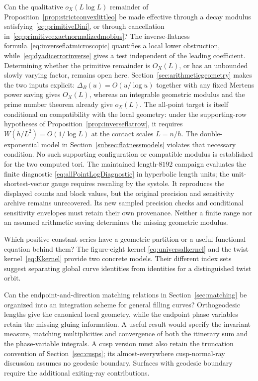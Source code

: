 \begin{question}
Can the qualitative $o_X(L\log L)$ remainder of
Proposition~\ref{prop:strictconvexlittleo} be made effective through a
decay modulus satisfying~\eqref{eq:primitiveDini}, or through cancellation
in~\eqref{eq:primitiveexactnormalizedmobius}? The inverse-flatness
formula~\eqref{eq:inverseflatmicroscopic} quantifies a local lower
obstruction, while~\eqref{eq:dyadicerrorinverse} gives a test independent
of the leading coefficient. Determining whether the primitive remainder
is $O_X(L)$, or has an unbounded slowly varying factor, remains open here.
Section~\ref{sec:arithmeticgeometry} makes the two inputs explicit:
$\Delta_B(u)=O(u/\log u)$ together with any fixed Mertens power
saving gives $O_X(L)$, whereas an integrable geometric modulus and
the prime number theorem already give $o_X(L)$.
The all-point target is itself conditional on compatibility with the
local geometry: under the supporting-row hypotheses of
Proposition~\ref{prop:inverseflatrow}, it requires
$W(h/L^2)=O(1/\log L)$ at the contact scales $L=n/h$.
The double-exponential model in Section~\ref{subsec:flatnessmodels}
violates that necessary condition. No such supporting configuration
or compatible modulus is established for the two computed tori.
The maintained length-$8192$ campaign evaluates the finite diagnostic
\eqref{eq:allPointLogDiagnostic} in hyperbolic length units; the
unit-shortest-vector gauge requires rescaling by the systole.
It reproduces the displayed counts and block values, but the original
precision and sensitivity archive remains unrecovered. Its new
sampled precision checks and conditional sensitivity envelopes must
retain their own provenance. Neither a finite range nor an assumed
arithmetic saving determines the missing geometric modulus.
\end{question}

\begin{question}
Which positive constant series have a geometric partition or a useful
functional equation behind them? The figure-eight kernel
\eqref{eq:universalkernel} and the twist kernel~\eqref{eq:Kkernel} provide
two concrete models. Their different index sets suggest separating
global curve identities from identities for a distinguished twist orbit.
\end{question}

\begin{question}
Can the endpoint-and-direction matching relations in
Section~\ref{sec:matching} be organized into an integration scheme for
general filling curves? Orthogeodesic lengths give the canonical local
geometry, while the endpoint phase variables retain the missing gluing
information. A useful result would specify the invariant measure,
matching multiplicities and convergence of both the itinerary sum and
the phase-variable integrals. A cusp version must also retain the
truncation convention of Section~\ref{sec:cusps}; its
almost-everywhere cusp-normal-ray discussion assumes no geodesic
boundary. Surfaces with geodesic boundary require the additional
exiting-ray contributions.
\end{question}

